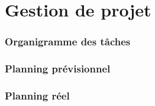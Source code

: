 \part{Gestion de projet}
\section{Organigramme des tâches}
\section{Planning prévisionnel}
\section{Planning réel}
